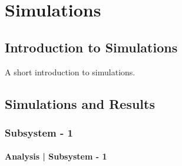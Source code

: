 \chapter{Simulations}
\label{chapter:simulations}
\section{Introduction to Simulations}
A short introduction to simulations.

\section{Simulations and Results}


\subsection{Subsystem - 1}
\subsubsection{Analysis | Subsystem - 1}
